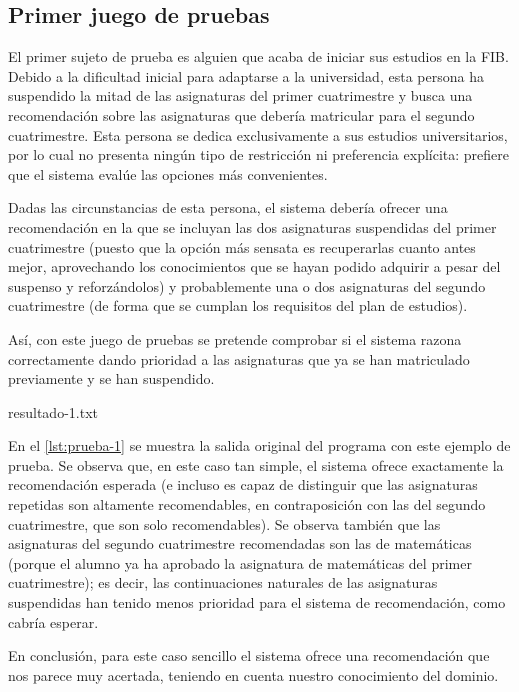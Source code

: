 
\subsection{Primer juego de pruebas} \label{sec:prueba-1}

El primer sujeto de prueba es alguien que acaba de iniciar sus estudios en la 
FIB. Debido a la dificultad inicial para adaptarse a la universidad, esta 
persona ha suspendido la mitad de las asignaturas del primer cuatrimestre y 
busca una recomendación sobre las asignaturas que debería matricular para el 
segundo cuatrimestre. Esta persona se dedica exclusivamente a sus estudios 
universitarios, por lo cual no presenta ningún tipo de restricción ni 
preferencia explícita: prefiere que el sistema evalúe las opciones más 
convenientes. 

Dadas las circunstancias de esta persona, el sistema debería ofrecer una 
recomendación en la que se incluyan las dos asignaturas suspendidas del primer 
cuatrimestre (puesto que la opción más sensata es recuperarlas cuanto antes 
mejor, aprovechando los conocimientos que se hayan podido adquirir a pesar del 
suspenso y reforzándolos) y probablemente una o dos asignaturas del segundo 
cuatrimestre (de forma que se cumplan los requisitos del plan de estudios).

Así, con este juego de pruebas se pretende comprobar si el sistema razona 
correctamente dando prioridad a las asignaturas que ya se han matriculado 
previamente y se han suspendido.

%
    {resultado-1.txt}

En el \autoref{lst:prueba-1} se muestra la salida original del programa con 
este ejemplo de prueba. Se observa que, en este caso tan simple, el sistema 
ofrece exactamente la recomendación esperada (e incluso es capaz de distinguir 
que las asignaturas repetidas son altamente recomendables, en contraposición 
con las del segundo cuatrimestre, que son solo recomendables). Se observa 
también que las asignaturas del segundo cuatrimestre recomendadas son las de 
matemáticas (porque el alumno ya ha aprobado la asignatura de matemáticas del 
primer cuatrimestre); es decir, las continuaciones naturales de las 
asignaturas suspendidas han tenido menos prioridad para el sistema de 
recomendación, como cabría esperar.

En conclusión, para este caso sencillo el sistema ofrece una recomendación 
que nos parece muy acertada, teniendo en cuenta nuestro conocimiento del 
dominio.


